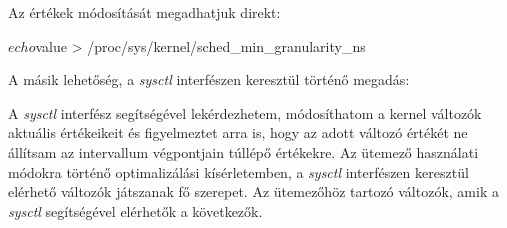 Az értékek módosítását megadhatjuk direkt:
\begin{python}
$ echo $value > /proc/sys/kernel/sched_min_granularity_ns
\end{python}%
A másik lehetőség, a \textit{sysctl} interfészen keresztül történő megadás:
A \textit{sysctl} interfész segítségével lekérdezhetem, módosíthatom a kernel változók aktuális értékeikeit és figyelmeztet arra is, hogy az adott változó értékét ne állítsam az intervallum végpontjain túllépő értékekre.
Az ütemező használati módokra történő optimalizálási kísérletemben, a \textit{sysctl} interfészen keresztül elérhető változók játszanak fő szerepet. Az ütemezőhöz tartozó változók, amik a \textit{sysctl} segítségével elérhetők a következők.
